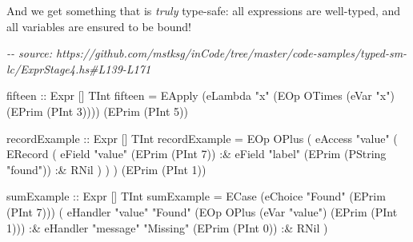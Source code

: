 \documentclass[]{article}
\newenvironment{Shaded}{}{}
\newcommand{\CommentTok}[1]{\textcolor[rgb]{0.38,0.63,0.69}{\textit{#1}}}
\newcommand{\DataTypeTok}[1]{\textcolor[rgb]{0.56,0.13,0.00}{#1}}
\newcommand{\DecValTok}[1]{\textcolor[rgb]{0.25,0.63,0.44}{#1}}
\newcommand{\NormalTok}[1]{#1}
\newcommand{\OperatorTok}[1]{\textcolor[rgb]{0.40,0.40,0.40}{#1}}
\newcommand{\OtherTok}[1]{\textcolor[rgb]{0.00,0.44,0.13}{#1}}
\newcommand{\StringTok}[1]{\textcolor[rgb]{0.25,0.44,0.63}{#1}}
\begin{document}
And we get something that is \emph{truly} type-safe: all expressions are
well-typed, and all variables are ensured to be bound!

\begin{Shaded}
\begin{Highlighting}[]
\CommentTok{{-}{-} source: https://github.com/mstksg/inCode/tree/master/code{-}samples/typed{-}sm{-}lc/ExprStage4.hs\#L139{-}L171}

\OtherTok{fifteen ::} \DataTypeTok{Expr}\NormalTok{ \textquotesingle{}[] }\DataTypeTok{TInt}
\NormalTok{fifteen }\OtherTok{=}
  \DataTypeTok{EApply}
\NormalTok{    (eLambda }\StringTok{"x"}\NormalTok{ (}\DataTypeTok{EOp} \DataTypeTok{OTimes}\NormalTok{ (eVar }\StringTok{"x"}\NormalTok{) (}\DataTypeTok{EPrim}\NormalTok{ (}\DataTypeTok{PInt} \DecValTok{3}\NormalTok{))))}
\NormalTok{    (}\DataTypeTok{EPrim}\NormalTok{ (}\DataTypeTok{PInt} \DecValTok{5}\NormalTok{))}

\OtherTok{recordExample ::} \DataTypeTok{Expr}\NormalTok{ \textquotesingle{}[] }\DataTypeTok{TInt}
\NormalTok{recordExample }\OtherTok{=}
  \DataTypeTok{EOp}
    \DataTypeTok{OPlus}
\NormalTok{    ( eAccess}
        \StringTok{"value"}
\NormalTok{        ( }\DataTypeTok{ERecord}
\NormalTok{            ( eField }\StringTok{"value"}\NormalTok{ (}\DataTypeTok{EPrim}\NormalTok{ (}\DataTypeTok{PInt} \DecValTok{7}\NormalTok{))}
                \OperatorTok{:\&}\NormalTok{ eField }\StringTok{"label"}\NormalTok{ (}\DataTypeTok{EPrim}\NormalTok{ (}\DataTypeTok{PString} \StringTok{"found"}\NormalTok{))}
                \OperatorTok{:\&} \DataTypeTok{RNil}
\NormalTok{            )}
\NormalTok{        )}
\NormalTok{    )}
\NormalTok{    (}\DataTypeTok{EPrim}\NormalTok{ (}\DataTypeTok{PInt} \DecValTok{1}\NormalTok{))}

\OtherTok{sumExample ::} \DataTypeTok{Expr}\NormalTok{ \textquotesingle{}[] }\DataTypeTok{TInt}
\NormalTok{sumExample }\OtherTok{=}
  \DataTypeTok{ECase}
\NormalTok{    (eChoice }\StringTok{"Found"}\NormalTok{ (}\DataTypeTok{EPrim}\NormalTok{ (}\DataTypeTok{PInt} \DecValTok{7}\NormalTok{)))}
\NormalTok{    ( eHandler }\StringTok{"value"} \StringTok{"Found"}\NormalTok{ (}\DataTypeTok{EOp} \DataTypeTok{OPlus}\NormalTok{ (eVar }\StringTok{"value"}\NormalTok{) (}\DataTypeTok{EPrim}\NormalTok{ (}\DataTypeTok{PInt} \DecValTok{1}\NormalTok{)))}
        \OperatorTok{:\&}\NormalTok{ eHandler }\StringTok{"message"} \StringTok{"Missing"}\NormalTok{ (}\DataTypeTok{EPrim}\NormalTok{ (}\DataTypeTok{PInt} \DecValTok{0}\NormalTok{))}
        \OperatorTok{:\&} \DataTypeTok{RNil}
\NormalTok{    )}
\end{Highlighting}
\end{Shaded}
\end{document}
